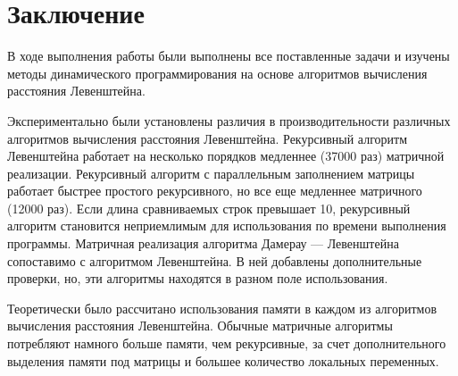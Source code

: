 \chapter*{Заключение}

В ходе выполнения работы были выполнены все поставленные задачи и изучены методы динамического программирования на основе алгоритмов вычисления расстояния Левенштейна.

Экспериментально были установлены различия в производительности различных алгоритмов вычисления расстояния Левенштейна. Рекурсивный алгоритм Левенштейна работает на несколько порядков медленнее (37000 раз) матричной реализации. Рекурсивный алгоритм с параллельным заполнением матрицы работает быстрее простого рекурсивного, но все еще медленнее матричного (12000 раз). Если длина сравниваемых строк превышает 10, рекурсивный алгоритм становится неприемлимым для использования по времени выполнения программы. Матричная реализация алгоритма Дамерау — Левенштейна сопоставимо с алгоритмом Левенштейна. В ней добавлены дополнительные проверки, но, эти алгоритмы находятся в разном поле использования.

Теоретически было рассчитано использования памяти в каждом из алгоритмов вычисления расстояния Левенштейна. Обычные матричные алгоритмы потребляют намного больше памяти, чем рекурсивные, за счет дополнительного выделения памяти под матрицы и большее количество локальных переменных.